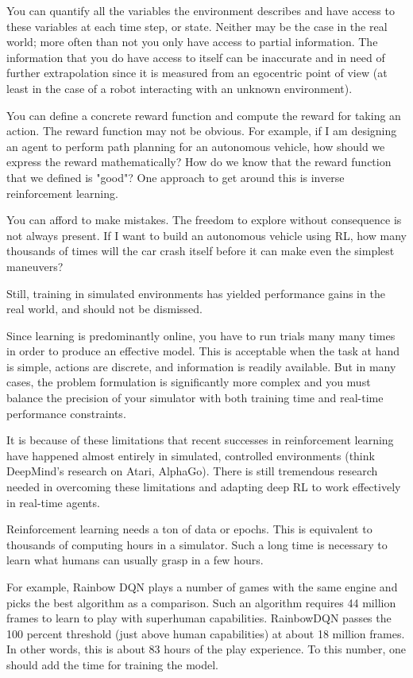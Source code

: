 \documentclass[conference]{IEEEtran}
\begin{document}
You can quantify all the variables the environment describes and have access to these variables at each time step, or state. Neither may be the case in the real world; more often than not you only have access to partial information. The information that you do have access to itself can be inaccurate and in need of further extrapolation since it is measured from an egocentric point of view (at least in the case of a robot interacting with an unknown environment).

You can define a concrete reward function and compute the reward for taking an action. The reward function may not be obvious. For example, if I am designing an agent to perform path planning for an autonomous vehicle, how should we express the reward mathematically? How do we know that the reward function that we defined is "good"? One approach to get around this is inverse reinforcement learning.

You can afford to make mistakes. The freedom to explore without consequence is not always present. If I want to build an autonomous vehicle using RL, how many thousands of times will the car crash itself before it can make even the simplest maneuvers?

Still, training in simulated environments has yielded performance gains in the real world, and should not be dismissed.

Since learning is predominantly online, you have to run trials many many times in order to produce an effective model. This is acceptable when the task at hand is simple, actions are discrete, and information is readily available. But in many cases, the problem formulation is significantly more complex and you must balance the precision of your simulator with both training time and real-time performance constraints.

It is because of these limitations that recent successes in reinforcement learning have happened almost entirely in simulated, controlled environments (think DeepMind's research on Atari, AlphaGo). There is still tremendous research needed in overcoming these limitations and adapting deep RL to work effectively in real-time agents.

Reinforcement learning needs a ton of data or epochs. This is equivalent to thousands of computing hours in a simulator. Such a long time is necessary to learn what humans can usually grasp in a few hours.

For example, Rainbow DQN plays a number of games with the same engine and picks the best algorithm as a comparison. Such an algorithm requires 44 million frames to learn to play with superhuman capabilities. RainbowDQN passes the 100 percent threshold (just above human capabilities) at about 18 million frames. In other words, this is about 83 hours of the play experience. To this number, one should add the time for training the model.
\end{document}
